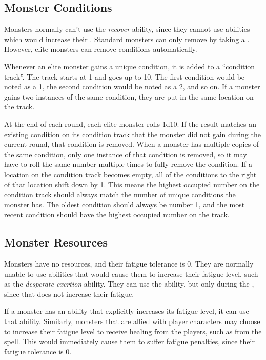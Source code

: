         \subsection{Monster Conditions}\label{Monster Conditions}
            Monsters normally can't use the \textit{recover} ability, since they cannot use abilities which would increase their .
            Standard monsters can only remove  by taking a .
            However, elite monsters can remove conditions automatically.

            Whenever an elite monster gains a unique condition, it is added to a ``condition track''.
            The track starts at 1 and goes up to 10.
            The first condition would be noted as a 1, the second condition would be noted as a 2, and so on.
            If a monster gains two instances of the same condition, they are put in the same location on the track.

            At the end of each round, each elite monster rolls 1d10.
            If the result matches an existing condition on its condition track that the monster did not gain during the current round, that condition is removed.
            When a monster has multiple copies of the same condition, only one instance of that condition is removed, so it may have to roll the same number multiple times to fully remove the condition.
            If a location on the condition track becomes empty, all of the conditions to the right of that location shift down by 1.
            This means the highest occupied number on the condition track should always match the number of unique conditions the monster has.
            The oldest condition should always be number 1, and the most recent condition should have the highest occupied number on the track.

        \subsection{Monster Resources}
            Monsters have no resources, and their fatigue tolerance is 0.
            They are normally unable to use abilities that would cause them to increase their fatigue level, such as the \textit{desperate exertion} ability.
            They can use the  ability, but only during the , since that does not increase their fatigue.

            If a monster has an ability that explicitly increases its fatigue level, it can use that ability.
            Similarly, monsters that are allied with player characters may choose to increase their fatigue level to receive healing from the players, such as from the  spell.
            This would immediately cause them to suffer fatigue penalties, since their fatigue tolerance is 0.

